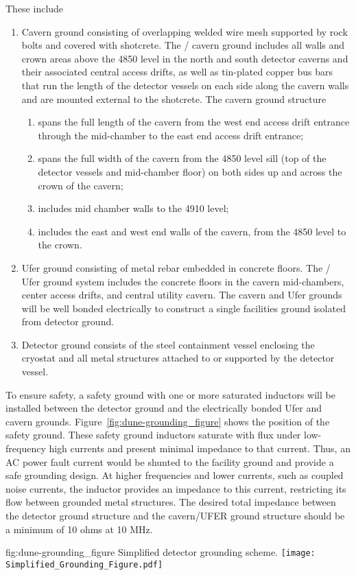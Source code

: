 These include
\begin{enumerate}
 \item Cavern ground consisting of overlapping welded wire mesh
   supported by rock bolts and covered with shotcrete. The
   / cavern ground includes all walls and
   crown areas above the 4850 level in the north and south detector
   caverns and their associated central access drifts, as well as tin-plated
   copper bus bars that run the length of the detector vessels
   on each side along the cavern walls and are mounted external to the
   shotcrete.  The cavern ground structure
\begin{enumerate}
 \item spans the full length of the cavern from the west end access
   drift entrance through the mid-chamber to the east end access drift
   entrance;
 \item spans the full width of the cavern from the 4850 level sill
   (top of the detector vessels and mid-chamber floor) on both sides
   up and across the crown of the cavern;
 \item includes mid chamber walls to the 4910 level;
 \item includes the east and west end walls of the cavern, from the
   4850 level to the crown.
\end{enumerate}
 \item Ufer  ground consisting of metal rebar embedded in concrete floors. The / Ufer ground system
   includes the concrete floors in the cavern mid-chambers, center
   access drifts, and central utility cavern. The cavern and Ufer
   grounds will be well bonded electrically to construct a single
   facilities ground isolated from detector ground.
 \item Detector ground consists of the steel containment vessel
   enclosing the cryostat and all metal structures attached to or
   supported by the detector vessel.
\end{enumerate}


To ensure safety, a safety ground with one or more
saturated inductors will be installed between the detector ground
and the electrically bonded Ufer and cavern grounds.
Figure~\ref{fig:dune-grounding_figure} shows the position of the safety ground. These safety ground inductors saturate with flux
under low-frequency high currents and present minimal impedance to
that current.  Thus, an AC power fault current would be shunted to the
facility ground and provide a safe grounding design. At higher
frequencies and lower currents, such as coupled noise currents, the
inductor provides an impedance to this current, restricting its
flow between grounded metal structures. The desired total impedance
between the detector ground structure and the cavern/UFER ground
structure should be a minimum of 10 ohms at 10 MHz.
\begin{dunefigure}{fig:dune-grounding_figure}
  {Simplified detector grounding scheme.}
  \texttt{[image: Simplified\_Grounding\_Figure.pdf]}
\end{dunefigure}


